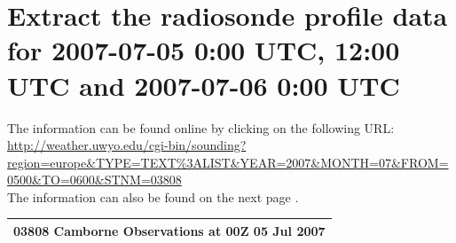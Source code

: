 \documentclass{article}
\begin{document}
\section{Extract the radiosonde profile data for 2007-07-05 0:00 UTC, 12:00 UTC and 2007-07-06 0:00 UTC}
The information can be found online by clicking on the following URL:\\
\url{http://weather.uwyo.edu/cgi-bin/sounding?region=europe\&TYPE=TEXT%3ALIST&YEAR=2007&MONTH=07&FROM=0500&TO=0600&STNM=03808}\\

The information can also be found on the next page \cite{assignment}.
\newpage

\begin{longtable}{r|r|r|r|r|r|r|r|r|r|r}
\multicolumn{11}{c}{\textbf{03808 Camborne Observations at 00Z 05 Jul 2007}}\\ \hline


\end{longtable}
\end{document}
